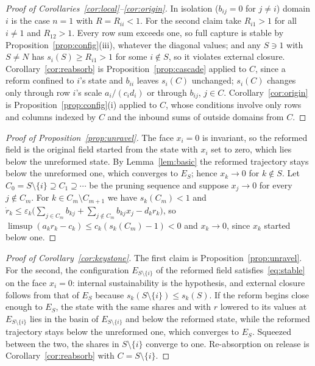 \documentclass[letterpaper]{article} %
\theoremstyle{definition}
\begin{document}
\begin{proof}[Proof of Corollaries~\ref{cor:local}--\ref{cor:origin}]
In isolation ($b_{ij}=0$ for $j\ne i$) domain $i$ is the case $n=1$ with $R=R_{ii}<1$. For the second claim take $R_{i1}>1$ for all $i\ne1$ and $R_{12}>1$. Every row sum exceeds one, so full capture is stable by Proposition~\ref{prop:config}(iii), whatever the diagonal values; and any $S\ni1$ with $S\ne N$ has $s_i(S)\ge R_{i1}>1$ for some $i\notin S$, so it violates external closure. Corollary~\ref{cor:reabsorb} is Proposition~\ref{prop:cascade} applied to $C$, since a reform confined to $i$'s state and $b_{ii}$ leaves $s_i(C)$ unchanged; $s_i(C)$ changes only through row $i$'s scale $a_i/(c_id_i)$ or through $b_{ij}$, $j\in C$. Corollary~\ref{cor:origin} is Proposition~\ref{prop:config}(i) applied to $C$, whose conditions involve only rows and columns indexed by $C$ and the inbound sums of outside domains from $C$.
\end{proof}

\begin{proof}[Proof of Proposition~\ref{prop:unravel}]
The face $x_i=0$ is invariant, so the reformed field is the original field started from the state with $x_i$ set to zero, which lies below the unreformed state. By Lemma~\ref{lem:basic} the reformed trajectory stays below the unreformed one, which converges to $E_S$; hence $x_k\to0$ for $k\notin S$. Let $C_0=S\setminus\{i\}\supseteq C_1\supseteq\cdots$ be the pruning sequence and suppose $x_j\to0$ for every $j\notin C_m$. For $k\in C_m\setminus C_{m+1}$ we have $s_k(C_m)<1$ and $\dot r_k\le\varepsilon_k\big(\sum_{j\in C_m}b_{kj}+\sum_{j\notin C_m}b_{kj}x_j-d_kr_k\big)$, so $\limsup(a_kr_k-c_k)\le c_k(s_k(C_m)-1)<0$ and $x_k\to0$, since $x_k$ started below one.
\end{proof}

\begin{proof}[Proof of Corollary~\ref{cor:keystone}]
The first claim is Proposition~\ref{prop:unravel}. For the second, the configuration $E_{S\setminus\{i\}}$ of the reformed field satisfies~\eqref{eq:stable} on the face $x_i=0$: internal sustainability is the hypothesis, and external closure follows from that of $E_S$ because $s_k(S\setminus\{i\})\le s_k(S)$. If the reform begins close enough to $E_S$, the state with the same shares and with $r$ lowered to its values at $E_{S\setminus\{i\}}$ lies in the basin of $E_{S\setminus\{i\}}$ and below the reformed state, while the reformed trajectory stays below the unreformed one, which converges to $E_S$. Squeezed between the two, the shares in $S\setminus\{i\}$ converge to one. Re-absorption on release is Corollary~\ref{cor:reabsorb} with $C=S\setminus\{i\}$.
\end{proof}
\end{document}

